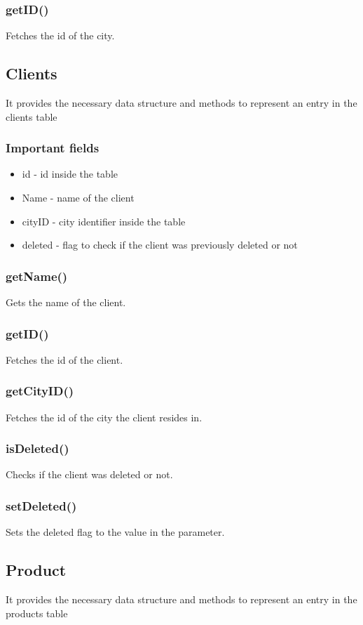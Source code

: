 \documentclass[10pt,a4paper]{article}
\begin{document}
\subsubsection{getID()}
Fetches the id of the city.

\subsection{Clients}
It provides the necessary data structure and methods to represent an entry in the clients table
\subsubsection{Important fields}
\begin{itemize}
\item id - id inside the table
\item Name - name of the client
\item cityID - city identifier inside the table
\item deleted - flag to check if the client was previously deleted or not
\end{itemize}
\subsubsection{getName()}
Gets the name of the client.
\subsubsection{getID()}
Fetches the id of the client.
\subsubsection{getCityID()}
Fetches the id of the city the client resides in.
\subsubsection{isDeleted()}
Checks if the client was deleted or not.
\subsubsection{setDeleted()}
Sets the deleted flag to the value in the parameter.

\subsection{Product}
It provides the necessary data structure and methods to represent an entry in the products table
\end{document}
